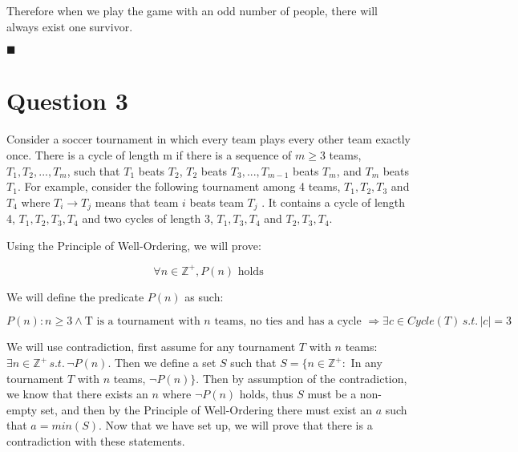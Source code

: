 \documentclass[20pt]{article}
\begin{document}
\noindent
\begin{text}
    Therefore when we play the game with an odd number of people, there will always exist one survivor.
\end{text}

\hfill $\blacksquare$



\newpage

\section*{Question 3}

\begin{text}
    Consider a soccer tournament in which every team plays every other team exactly once. There is a
cycle of length m if there is a sequence of $m \geq 3$ teams, $T_1, T_2, ..., T_m$, such that $T_1$ beats $T_2$, $T_2$ beats $T_3, ..., T_{m - 1}$ beats $T_m$, and $T_m$ beats $T_1$. For example, consider the following tournament among 4 teams, $T_1, T_2, T_3$ and $T_4$ where $T_i \longrightarrow T_j$ means that team $i$ beats team $T_j$ . It contains a cycle of length 4, $T_1, T_2, T_3, T_4$ and two cycles of length 3, $T_1, T_3, T_4$ and $T_2, T_3, T_4$.
\end{text}

\noindent 
\begin{text}
    Using the Principle of Well-Ordering, we will prove:
\end{text}

\begin{equation}
    \forall n \in \mathbb{Z}^+, P(n) \text{ holds} \tag{Where $n$ is the number of teams in the tournament}\nonumber
\end{equation}

\noindent 
\begin{text}
    We will define the predicate $P(n)$ as such:
\end{text}

\begin{equation}
    P(n): n \geq 3 \land \text{T is a tournament with $n$ teams, no ties and has a cycle } \Rightarrow \exists c \in Cycle(T) \, s.t. \, |c| = 3 \nonumber
\end{equation}

\noindent 
\begin{text}
    We will use contradiction, first assume for any tournament $T$ with $n$ teams: $\exists n \in \mathbb{Z}^+ \, s.t. \, \neg P(n)$. Then we define a set $S$ such that $S = \{ n \in \mathbb{Z}^+ :$ In any tournament $T$ with $n$ teams, $ \neg P(n) \}$. Then by assumption of the contradiction, we know that there exists an $n$ where $\neg P(n)$ holds, thus $S$ must be a non-empty set, and then by the Principle of Well-Ordering there must exist an $a$ such that $a = min(S)$. Now that we have set up, we will prove that there is a contradiction with these statements.\\
\end{text}
\end{document}
